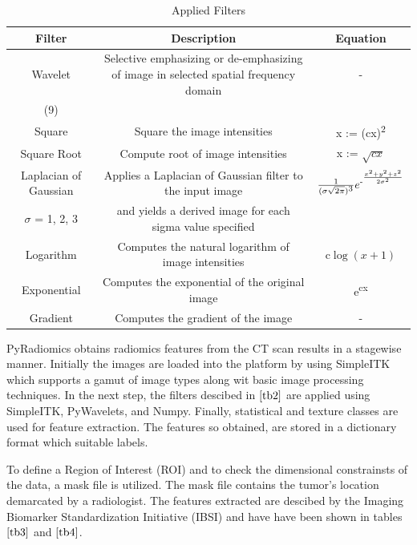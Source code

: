 \documentclass[10pt,journal,compsoc]{IEEEtran}
\newcommand\sufr[3][0pt]{$\rule{0pt}{\dimexpr#1+1.4ex\relax}^\frac{#2}{#3}$}
\begin{document}
\begin{table}[!b]
\centering
\caption{Applied Filters}
\label{tb2}
\begin{tabular}{| c | c | c |}
\hline
Filter & Description & Equation\\
\hline
Wavelet & Selective emphasizing or de-emphasizing of image in selected spatial frequency domain & -\\
(9)&&\\
\hline
Square & Square the image intensities & x := (cx)\textsuperscript{2}\\
\hline
Square Root & Compute root of image intensities & x := $\sqrt{cx}$\\
\hline
Laplacian of Gaussian & Applies a Laplacian of Gaussian filter to the input image  & $\frac{1}{(\sigma\sqrt{2\pi})\textsuperscript{3}}e\textsuperscript{-\sufr{x\textsuperscript{2}+y\textsuperscript{2}+z\textsuperscript{2}}{2\sigma\textsuperscript{2}}}$\\
$\sigma$ = 1, 2, 3&and yields a derived image for each sigma value specified&\\
\hline
Logarithm & Computes the natural logarithm of image intensities & c$\log(x+1)$\\
\hline
Exponential & Computes the exponential of the original image & e\textsuperscript{cx}\\
\hline
Gradient & Computes the gradient of the image & -\\
\hline
\end{tabular}
\end{table}

PyRadiomics obtains radiomics features from the CT scan results in a stagewise manner. Initially the images are loaded into the platform by using SimpleITK which supports a gamut of image types along wit basic image processing techniques. In the next step, the filters descibed in $\ref{tb2}$ are applied using SimpleITK, PyWavelets, and Numpy. Finally, statistical and texture classes are used for feature extraction. The features so obtained, are stored in a dictionary format which suitable labels. 

To define a Region of Interest (ROI) and to check the dimensional constrainsts of the data, a mask file is utilized. The mask file contains the tumor's location demarcated by a radiologist. The features extracted are descibed by the Imaging Biomarker Standardization Initiative (IBSI) and have have been shown in tables $\ref{tb3}$ and $\ref{tb4}$.
\end{document}
